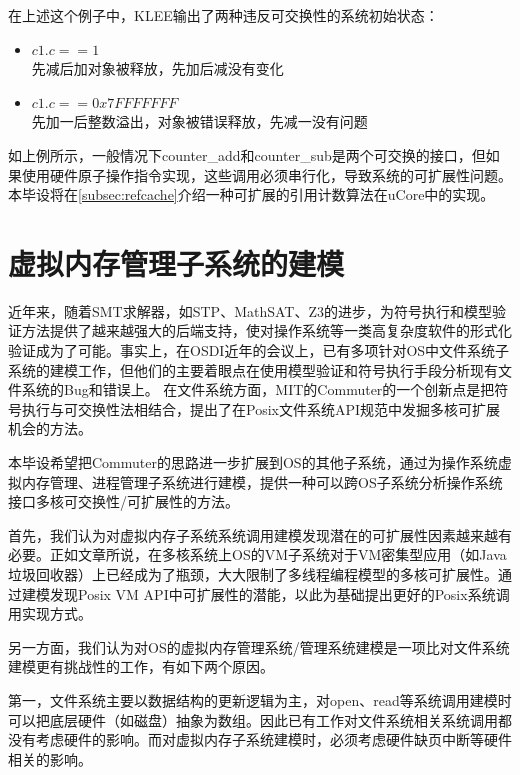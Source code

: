 在上述这个例子中，KLEE输出了两种违反可交换性的系统初始状态：
\begin{itemize}
	\item ${c1.c == 1}$ \\
		先减后加对象被释放，先加后减没有变化
	\item ${c1.c ==
		0x7FFFFFFF}$ \\
		先加一后整数溢出，对象被错误释放，先减一没有问题
\end{itemize}

如上例所示，一般情况下counter\_add和counter\_sub是两个可交换的接口，但如果使用硬件原子操作指令实现，这些调用必须串行化，导致系统的可扩展性问题。本毕设将在\ref{subsec:refcache}介绍一种可扩展的引用计数算法在uCore中的实现。

\section{虚拟内存管理子系统的建模}
\label{sec:vm-model}

近年来，随着SMT求解器，如STP、MathSAT、Z3\cite{DeMoura:2008:ZES:1792734.1792766}的进步，为符号执行和模型验证方法提供了越来越强大的后端支持，使对操作系统等一类高复杂度软件的形式化验证成为了可能。事实上，在OSDI近年的会议上，已有多项针对OS中文件系统子系统的建模工作\cite{radixvm:eurosys13}\cite{Yang:2006:UMC:1189256.1189259}，但他们的主要着眼点在使用模型验证和符号执行手段分析现有文件系统的Bug和错误上。
在文件系统方面，MIT的Commuter\cite{commuter:2013}的一个创新点是把符号执行与可交换性法相结合，提出了在Posix文件系统API规范中发掘多核可扩展机会的方法。

本毕设希望把Commuter的思路进一步扩展到OS的其他子系统，通过为操作系统虚拟内存管理、进程管理子系统进行建模，提供一种可以跨OS子系统分析操作系统接口多核可交换性/可扩展性的方法。

首先，我们认为对虚拟内存子系统系统调用建模发现潜在的可扩展性因素越来越有必要。正如文章\cite{radixvm:eurosys13}所说，在多核系统上OS的VM子系统对于VM密集型应用（如Java垃圾回收器）上已经成为了瓶颈，大大限制了多线程编程模型的多核可扩展性。通过建模发现Posix
VM API中可扩展性的潜能，以此为基础提出更好的Posix系统调用实现方式。

另一方面，我们认为对OS的虚拟内存管理系统/管理系统建模是一项比对文件系统建模更有挑战性的工作，有如下两个原因。

第一，文件系统主要以数据结构的更新逻辑为主，对open、read等系统调用建模时可以把底层硬件（如磁盘）抽象为数组。因此已有工作对文件系统相关系统调用都没有考虑硬件的影响。而对虚拟内存子系统建模时，必须考虑硬件缺页中断等硬件相关的影响。

